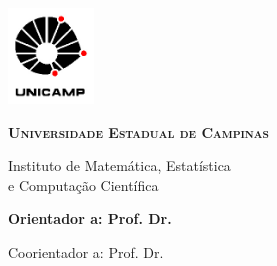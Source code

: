 \includegraphics[width=.94in, height=1in,
keepaspectratio=true]{figuras/unicamp-logo.jpg}
\begin{center}
    {\large \scshape \bfseries Universidade Estadual de Campinas
    \vspace{.5cm}
    
    Instituto de Matem\'atica, Estat\'istica \\
    e Computa\c c\~ao Cient\'ifica}
\end{center}
\vspace{.7cm}
\begin{center}
    {\large \scshape \bfseries \autor}
\end{center}
\vspace{.7cm}
\begin{center}
    {\Large \scshape \bfseries \titulo}
\end{center}
\vspace{.8cm}
{\bfseries
\noindent
Orientador\ifx\femaleOrientador\undefined
\else
a\fi: Prof. Dr. \orientador
\vspace{.25cm}

\ifx\coorientador\undefined
\else
\noindent
Coorientador\ifx\femaleCoorientador\undefined
\else
a\fi: Prof. Dr. \coorientador
\fi
}

